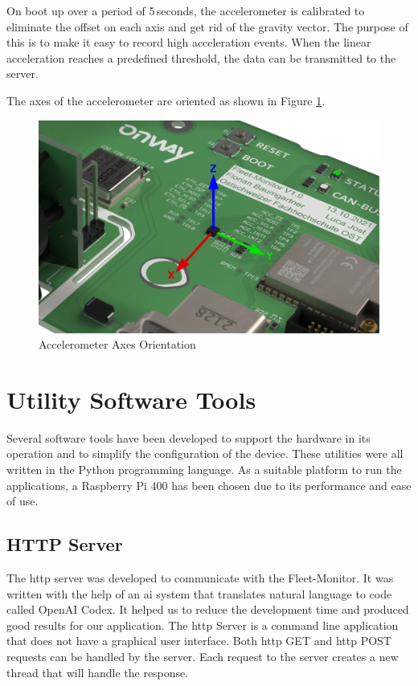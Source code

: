 On boot up over a period of 5\,seconds, the accelerometer is calibrated to eliminate the offset on each axis and get rid of the gravity vector. The purpose of this is to make it easy to record high acceleration events. When the linear acceleration reaches a predefined threshold, the data can be transmitted to the server.

The axes of the accelerometer are oriented as shown in Figure \ref{fig:accel-axis}.

\begin{figure}[h!]
	\centering
	\includegraphics[width=\textwidth]{images/Accel-axis}
	\caption{Accelerometer Axes Orientation}
	\label{fig:accel-axis}
\end{figure}

\newpage
\section{Utility Software Tools}
Several software tools have been developed to support the hardware in its operation and to simplify the configuration of the device. These utilities were all written in the Python programming language. As a suitable platform to run the applications, a Raspberry Pi 400 has been chosen due to its performance and ease of use.

\subsection{HTTP Server}
The \acrshort{http} server was developed to communicate with the Fleet-Monitor. It was written with the help of an \acrshort{ai} system that translates natural language to code called OpenAI Codex. It helped us to reduce the development time and produced good results for our application. The \acrshort{http} Server is a command line application that does not have a graphical user interface. Both \acrshort{http} GET and \acrshort{http} POST requests can be handled by the server. Each request to the server creates a new thread that will handle the response.

